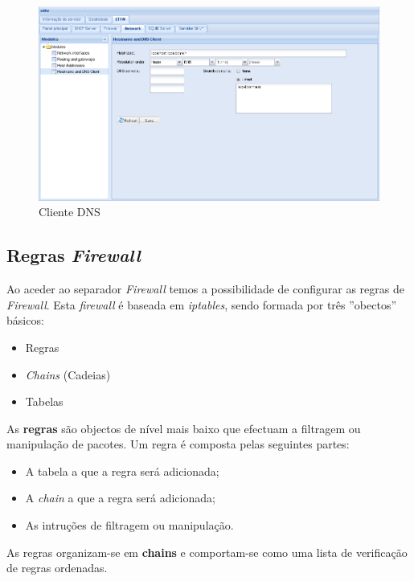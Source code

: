 \begin{figure}[H]
    \begin{center}
    \includegraphics[scale=0.38]{screenshots/etfw/etfw_network_dnsclient_01.png}
    \caption{Cliente DNS}
    \label{fig:etfw_network_dnsclient_01}
    \end{center}
\end{figure}

\subsection{Regras \textit{Firewall}}

Ao aceder ao separador \textit{Firewall} temos a possibilidade de configurar as regras de \textit{Firewall}.
Esta \textit{firewall} é baseada em \textit{iptables}, sendo formada por três ''obectos'' básicos:

\begin{itemize}
    \item Regras
    \item \textit{Chains} (Cadeias)
    \item Tabelas
\end{itemize}

As \textbf{regras} são objectos de nível mais baixo que efectuam a filtragem ou manipulação de pacotes.
Um regra é composta pelas seguintes partes:

\begin{itemize}
\item A tabela a que a regra será adicionada;
\item A \textit{chain} a que a regra será adicionada;
\item As intruções de filtragem ou manipulação.
\end{itemize}

As regras organizam-se em \textbf{chains} e comportam-se como uma lista de verificação de regras ordenadas.

